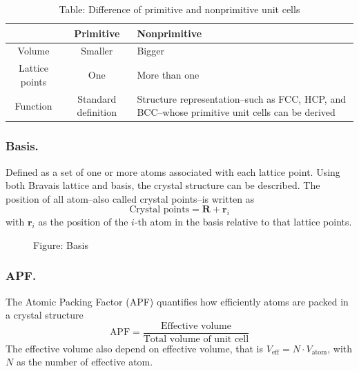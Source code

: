 \documentclass[../../../main.tex]{subfiles}
\begin{document}
\begin{table}[h]
    \centering
    \caption*{Table: Difference of primitive and nonprimitive unit cells}
    \begin{tabular}{ cc>{\centering\arraybackslash}p{2cm}}
        \toprule
                       & Primitive           & Nonprimitive                                                                                   \\
        \midrule
        Volume         & Smaller             & Bigger                                                                                         \\
        Lattice points & One                 & More than one                                                                                  \\
        Function       & Standard definition & Structure representation--such as FCC, HCP, and BCC--whose primitive unit cells can be derived \\
        \bottomrule
    \end{tabular}
\end{table}

\subsubsection{Basis.}
Defined as a set of one or more atoms associated with each lattice point.
Using both Bravais lattice and basis, the crystal structure can be described.
The position of all atom--also called crystal points--is written as
\begin{equation*}
    \text{Crystal points}=\mathbf{R}+\mathbf{r}_i
\end{equation*}
with $\mathbf{r}_i$ as the position of the $i$-th atom in the basis relative to that lattice points.
\begin{figure}[b]
    \centering
    \caption*{Figure: Basis}
\end{figure}

\subsubsection{APF.}
The Atomic Packing Factor (APF) quantifies how efficiently atoms are packed in a crystal structure
\begin{equation*}
    \text{APF}=\frac{\text{Effective volume}}{\text{Total volume of unit cell}}
\end{equation*}
The effective volume also depend on effective volume, that is $V_\text{eff}=N \cdot V_\text{atom}$, with $N$ as the number of effective atom.
\end{document}
